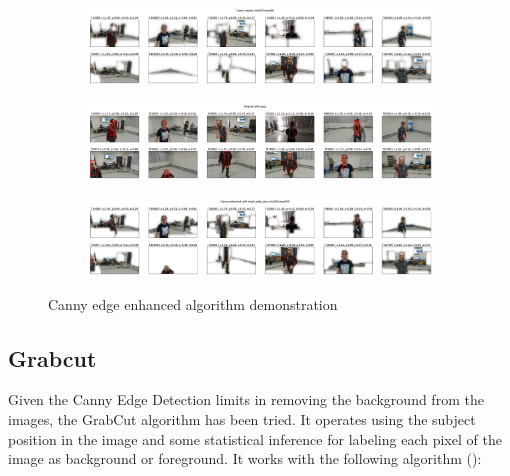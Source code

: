 \begin{figure}[!h]
	\begin{center}
		\begin{subfigure}[h]{1\textwidth}
			\centering
			\includegraphics[width=1\textwidth]{"contents/images/04-1canny-enhance-1"}
		\end{subfigure}
		\vfill
		\begin{subfigure}[h]{1\textwidth}
			\centering
			\includegraphics[width=1\textwidth]{"contents/images/04-1canny-enhance-2"}
		\end{subfigure}
		\vfill
		\begin{subfigure}[h]{1\textwidth}
			\centering
			\includegraphics[width=1\textwidth]{"contents/images/04-1canny-enhance-3"}
		\end{subfigure}
	\end{center}
	\vspace{-0.5cm}
	\caption[Canny edge enhanced algorithm demonstration]{Canny edge enhanced algorithm demonstration}
	\label{fig:canny-enanhced}
\end{figure}



\subsection{Grabcut}
\label{subsec:masking-grabcut}

Given the Canny Edge Detection limits in removing the background from the images, the GrabCut algorithm has been tried. It operates using the subject position in the image and some statistical inference for labeling each pixel of the image as background or foreground. It works with the following algorithm (\cite{opencv_grabcut}):

